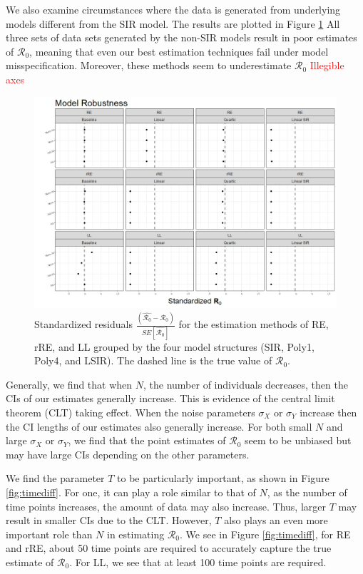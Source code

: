 \documentclass[12pt]{article}
\newcommand{\com}[1]{\textcolor{red}{ #1}}
\newcommand{\rr}{\ensuremath{\mathcal{R}_0}}
\begin{document}
We also examine circumstances where the data is generated from underlying models different from the SIR model.  The results are plotted in Figure \ref{fig:mod-rob}  All three sets of data sets generated by the non-SIR models result in poor estimates of $\rr$, meaning that even our best estimation techniques fail under model misspecification.  Moreover, these methods seem to underestimate $\rr$ \com{Illegible axes}

\begin{figure}[H]
	\centering
	\includegraphics[scale=0.5]{images/model_robust.jpeg}
	\caption{Standardized residuals $\frac{\left ( \hat{\rr} - \rr\right ) }{SE \left [\hat{\rr}\right ]}$ for the estimation methods of RE, rRE, and LL grouped by the four model structures (SIR, Poly1, Poly4, and LSIR).  The dashed line is the true value of $\rr$.}\label{fig:mod-rob}
\end{figure}


Generally, we find that when $N$, the number of individuals decreases, then the CIs of our estimates generally increase.  This is evidence of the  central limit theorem (CLT) taking effect.   When the noise parameters $\sigma_X$ or $\sigma_Y$ increase then the CI lengths of our estimates also generally increase.  For both small $N$ and large $\sigma_X$ or $\sigma_Y$, we find that the point estimates of $\rr$ seem to be unbiased but may have large CIs depending on the other parameters.

We find the parameter $T$ to be particularly important, as shown in Figure \ref{fig:timediff}.  For one, it can play a role similar to that of $N$, as the number of time points increases, the amount of data may also increase.  Thus, larger $T$ may result in smaller CIs due to the CLT.  However, $T$ also plays an even more important role than $N$ in estimating $\rr$.  We see in Figure \ref{fig:timediff}, for RE and rRE, about 50 time points are required to accurately capture the true estimate of $\rr$.  For LL, we see that at least 100 time points are required.
\end{document}
